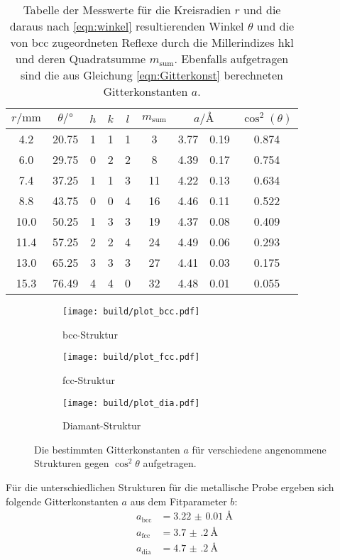 \begin{table}
\centering
\caption{Tabelle der Messwerte für die Kreisradien $r$ und die daraus nach \ref{eqn:winkel} resultierenden Winkel $\theta$
    und die von bcc zugeordneten Reflexe durch die Millerindizes hkl und deren Quadratsumme $m_{\mathrm{sum}}$.
    Ebenfalls aufgetragen sind die
    aus Gleichung \eqref{eqn:Gitterkonst} berechneten Gitterkonstanten $a$.}
  \label{tab:dia}
\begin{tabular}{S S c c c c S[table-format=1.2]@{${}\pm{}$} S[table-format=1.2] S[table-format=1.3]  }
\toprule
$r/\si{\milli\meter}$ & $\theta / \si{\degree}$ &$h$ & $k$ & $l$ & $m_{\mathrm{sum}}$ & 
&  {$\cos^2\left(\theta\right)$} \\
 	&	20.75	&	1	&	1	&	1	&	3	  &	3.77	&	0.19	&	0.874   \\
6.0 	&	29.75	&	0	&	2	&	2	&	8  	&	4.39  &	0.17	&	0.754   \\
7.4 	&	37.25	&	1	&	1	&	3	&	11	&	4.22  &	0.13 	&	0.634   \\
8.8 	&	43.75	&	0	&	0	&	4	&	16  &	4.46  &	0.11	&	0.522   \\
10.0	&	50.25	&	1	&	3	&	3	&	19	&	4.37	&	0.08	&	0.409   \\
11.4	&	57.25	&	2	&	2	&	4	&	24	&	4.49	&	0.06	&	0.293   \\
13.0	&	65.25	&	3	&	3	&	3	&	27	&	4.41	&	0.03	&	0.175   \\
15.3	&	76.49	&	4	&	4	&	0	&	32	&	4.48	&	0.01	&	0.055   \\
\bottomrule
\end{tabular}
\end{table}


\begin{figure}[hhh]
  \centering
  \begin{subfigure}{0.7\textwidth}
    \centering
    \texttt{[image: build/plot\_bcc.pdf]}
    \caption{bcc-Struktur}
    \label{subfig:bcc}
  \end{subfigure}
  \begin{subfigure}{.49\textwidth}
    \centering
    \texttt{[image: build/plot\_fcc.pdf]}
    \caption{fcc-Struktur}
    \label{subfig:fcc}
  \end{subfigure}
  \begin{subfigure}{.49\textwidth}
    \centering
    \texttt{[image: build/plot\_dia.pdf]}
    \caption{Diamant-Struktur}
    \label{subfig:dia}
  \end{subfigure}
  \caption{Die bestimmten Gitterkonstanten $a$ für verschiedene angenommene Strukturen gegen $\cos^2\theta$ aufgetragen.}
  \label{fig:metall}
\end{figure}
\FloatBarrier
Für die unterschiedlichen Strukturen für die metallische Probe ergeben sich folgende Gitterkonstanten $a$
aus dem Fitparameter $b$:
\begin{align*}
a_{\mathrm{bcc}}&=\SI{3.22(1)}{\angstrom}\\
a_{\mathrm{fcc}}&=\SI{3.7(2)}{\angstrom}\\
a_{\mathrm{dia}}&=\SI{4.7(2)}{\angstrom}
\end{align*}



